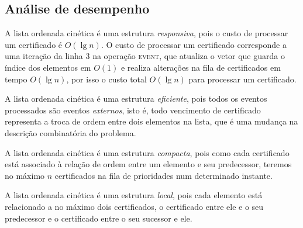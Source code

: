 





\subsection{Análise de desempenho}\label{subsec:analise-de-desempenho}

A lista ordenada cinética é uma estrutura \textit{responsiva}, pois o custo de
processar um certificado é $O(\lg{n})$.
O custo de processar um certificado corresponde a uma iteração da linha $3$ na operação
\textsc{event}, que atualiza o vetor que guarda o índice dos elementos em $O(1)$ e realiza
alterações na fila de certificados em tempo $O(\lg{n})$, por isso o custo total $O(\lg{n})$ para
processar um certificado.

A lista ordenada cinética é uma estrutura \textit{eficiente}, pois todos os eventos
processados são eventos \textit{externos}, isto é, todo vencimento de
certificado representa a troca de ordem entre dois elementos na lista, que é uma
mudança na descrição combinatória do problema.

A lista ordenada cinética é uma estrutura \textit{compacta}, pois como cada
certificado está associado à relação de ordem entre um elemento e seu
predecessor, teremos no máximo $n$ certificados na fila de prioridades num
determinado instante.

A lista ordenada cinética é uma estrutura \textit{local}, pois cada elemento
está relacionado a no máximo dois certificados, o certificado entre ele e o
seu predecessor e o certificado entre o seu sucessor e ele.
